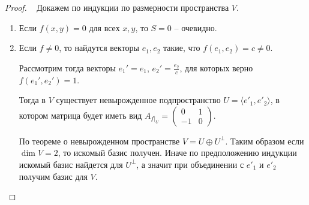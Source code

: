 \begin{proof}~
    Докажем по индукции по размерности пространства $V$. 
    \begin{enumerate}
        \item Если $f(x, y) = 0$ для всех $x, y$, то $S = 0$ -- очевидно.
        \item Если $f \neq 0$, то найдутся векторы $e_1, e_2$ такие, что $f(e_1, e_2) = c \neq 0$. 
        
        Рассмотрим тогда векторы $e_1' = e_1$, $e_2' = \frac{e_2}{c}$, для которых верно $f(e_1', e_2') = 1$.
        
        Тогда в $V$ существует невырожденное подпространство $U = \langle e'_1, e'_2 \rangle$,
        в котором матрица будет иметь вид $A_{f \vert_{U}} = \begin{pmatrix}
            0  &1 \\
            -1 &0
        \end{pmatrix}$.
        
        По теореме о невырожденном пространстве $V = U \oplus U^{\perp}$. Таким образом 
        если $\dim V = 2$, то искомый базис получен. Иначе по предположению
        индукции искомый базис найдется для $U^{\perp}$, а значит при объединении с $e'_1$ и $e'_2$ 
        получим базис для $V$.
    \end{enumerate}
\end{proof}